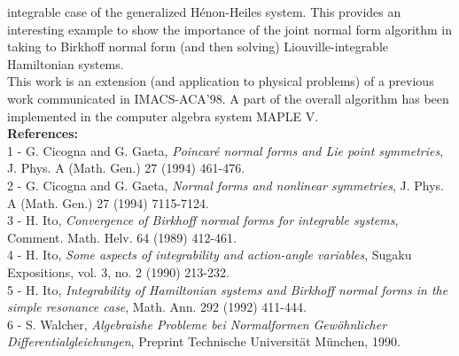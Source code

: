 \documentclass[11pt,thmsa]{article}
\begin{document}
integrable case of the generalized H\'enon-Heiles system. This provides an
interesting example to show the importance of the joint normal form
algorithm in taking to Birkhoff normal form (and then solving)
Liouville-integrable Hamiltonian systems.\\[0.2cm] This work is an extension
(and application to physical problems) of a previous work communicated in
IMACS-ACA'98. A part of the overall algorithm has been implemented in the
computer algebra system \textsc{MAPLE V}.\\[1cm] \textbf{References:}\\[0.2cm]  1 - G. Cicogna and G. Gaeta, \textit{Poincar\'e normal forms and
Lie point symmetries}, J. Phys. A (Math. Gen.) 27 (1994) 461-476.\\  2 - G.
Cicogna and G. Gaeta, \textit{Normal forms and nonlinear symmetries}, J.
Phys. A (Math. Gen.) 27 (1994) 7115-7124.\\  3 - H. Ito, \textit{Convergence
of Birkhoff normal forms for integrable systems}, Comment. Math. Helv. 64
(1989) 412-461.\\  4 - H. Ito, \textit{Some aspects of integrability and
action-angle variables}, Sugaku Expositions, vol. 3, no. 2 (1990) 213-232.\\ 
5 - H. Ito, \textit{Integrability of Hamiltonian systems and Birkhoff normal
forms in the simple resonance case}, Math. Ann. 292 (1992) 411-444.\\
6 - S. Walcher, \textit{Algebraishe Probleme bei Normalformen Gew\"ohnlicher
Differentialgleichungen}, Preprint Technische Universit\"at M\"unchen, 1990.
\end{document}
